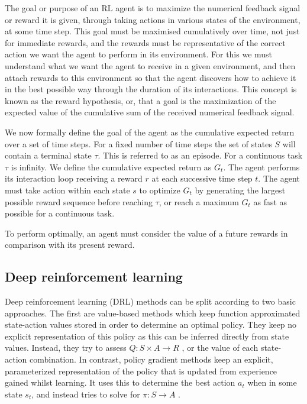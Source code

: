 \documentclass[a4paper,twoside,12pt]{report}
\begin{document}
The goal or purpose of an RL agent is to maximize the numerical feedback signal or reward it is given, through taking actions in various states of the environment, at some time step. This goal must be maximised cumulatively over time, not just for immediate rewards, and the rewards must be representative of the correct action we want the agent to perform in its environment. For this we must understand what we want the agent to receive in a given environment, and then attach rewards to this environment so that the agent discovers how to achieve it in the best possible way through the duration of its interactions. This concept is known as the reward hypothesis, or, that a goal is the maximization of the expected value of the cumulative sum of the received numerical feedback signal.

We now formally define the goal of the agent as the cumulative expected return over a set of time steps. For a fixed number of time steps the set of states $S$ will contain a terminal state $\tau$. This is referred to as an episode. For a continuous task $\tau$ is infinity. We define the cumulative expected return as $G_t$. The agent performs its interaction loop receiving a reward $r$ at each successive time step $t$. The agent must take action within each state $s$ to optimize $G_t$ by generating the largest possible reward sequence before reaching $\tau$, or reach a maximum $G_t$ as fast as possible for a continuous task.  

To perform optimally, an agent must consider the value of a future rewards in comparison with its present reward.  

\subsection{Deep reinforcement learning}
\label{drl}

Deep reinforcement learning (DRL) methods can be split according to two basic approaches. The first are value-based methods which keep function approximated state-action values stored in order to determine an optimal policy. They keep no explicit representation of this policy as this can be inferred directly from state values. Instead, they try to assess $Q:S \times A \rightarrow R$ \citep{moderndrl}, or the value of each state-action combination. In contrast, policy gradient methods keep an explicit, parameterized representation of the policy that is updated from experience gained whilst learning. It uses this to determine the best action $a_t$ when in some state $s_t$, and instead tries to solve for $\pi : S \rightarrow A$ \citep{moderndrl}. 
\end{document}

